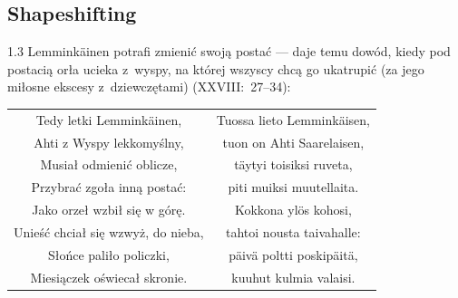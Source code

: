 \documentclass[11pt,a4paper,twoside]{report}
\begin{document}
\subsection*{Shapeshifting}
\begin{spacing}{1.3}
Lemminkäinen potrafi zmienić swoją postać --- daje temu dowód, kiedy pod postacią orła ucieka z~wyspy, na której wszyscy chcą go ukatrupić (za jego miłosne ekscesy z~dziewczętami) (XXVIII:~27--34):
\end{spacing}
{\centering
\small
\begin{longtable}{c c}
Tedy letki Lemminkäinen, & Tuossa lieto Lemminkäisen, \\
Ahti z Wyspy lekkomyślny, & tuon on Ahti Saarelaisen, \\
Musiał odmienić oblicze, & täytyi toisiksi ruveta, \\
Przybrać zgoła inną postać: & piti muiksi muutellaita. \\
Jako orzeł wzbił się w górę. & Kokkona ylös kohosi, \\
Unieść chciał się wzwyż, do nieba, & tahtoi nousta taivahalle: \\
Słońce paliło policzki, & päivä poltti poskipäitä, \\
Miesiączek oświecał skronie. & kuuhut kulmia valaisi. \\
\end{longtable}
}
\vspace*{0.5\baselineskip}
\end{document}
